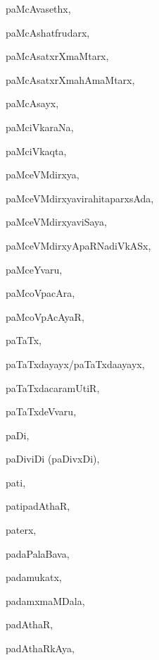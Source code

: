 \begin{multicols}{3}
{\noindent
{paMcAvasethx}, \pageref{paMcAvasethx}

\noindent
{paMcAshatfrudarx}, \pageref{paMcAshatfrudarx}

\noindent
{paMcAsatxrXmaMtarx}, \pageref{paMcAsatxrXmaMtarx}

\noindent
{paMcAsatxrXmahAmaMtarx}, \pageref{paMcAsatxrXmahAmaMtarx}

\noindent
{paMcAsayx}, \pageref{paMcAsayx}

\noindent
{paMciVkaraNa}, \pageref{paMciVkaraNa}

\noindent
{paMciVkaqta}, \pageref{paMciVkaqta}

\noindent
{paMceVMdirxya}, \pageref{paMceVMdirxya}

\noindent
{paMceVMdirxyavirahitaparxsAda}, \pageref{paMceVMdirxyavirahitaparxsAda}

\noindent
{paMceVMdirxyaviSaya}, \pageref{paMceVMdirxyaviSaya}

\noindent
{paMceVMdirxyApaRNadiVkASx}, \pageref{paMceVMdirxyApaRNadiVkASx}

\noindent
{paMceYvaru}, \pageref{paMceYvaru}

\noindent
{paMcoVpacAra}, \pageref{paMcoVpacAra}

\noindent
{paMcoVpAcAyaR}, \pageref{paMcoVpAcAyaR}

\noindent
{paTaTx}, \pageref{paTaTx}

\noindent
{paTaTxdayayx/paTaTxda{a}yayx}, \pageref{paTaTxdayayxpaTaTxdaayayx}

\noindent
{paTaTxdacaramUtiR}, \pageref{paTaTxdacaramUtiR}

\noindent
{paTaTxdeVvaru}, \pageref{paTaTxdeVvaru}

\noindent
{paDi}, \pageref{paDi}

\noindent
{paDiviDi (paDivxDi)}, \pageref{paDiviDipaDivxDi}

\noindent
{pati}, \pageref{pati}

\noindent
{patipadAthaR}, \pageref{patipadAthaR}

\noindent
{paterx}, \pageref{paterx}

\noindent
{padaPalaBava}, \pageref{padaPalaBava}

\noindent
{padamukatx}, \pageref{padamukatx}

\noindent
{padamxmaMDala}, \pageref{padamxmaMDala}

\noindent
{padAthaR}, \pageref{padAthaR}

\noindent
{padAthaRkAya}, \pageref{padAthaRkAya}

}
\end{multicols}
